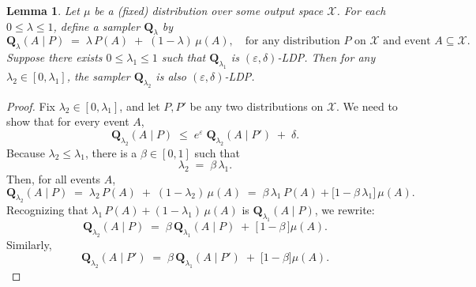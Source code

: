 \documentclass[accepted]{article}
\theoremstyle{plain} %
\newtheorem{lemma}[theorem]{Lemma}
\theoremstyle{definition}
\theoremstyle{remark}
\newcommand{\bQ}{\mathbf{Q}}
\begin{document}
\begin{lemma}\label{lem:decrease-lambda}
Let $\mu$ be a (fixed) distribution over some output space $\mathcal{X}$. For each $0 \leq \lambda \leq 1$, define a sampler $\bQ_\lambda$ by
\[
  \bQ_\lambda(A \mid P) \;=\; \lambda\,P(A) \;+\; (1-\lambda)\,\mu(A),
  \quad
  \text{for any distribution }P \text{ on } \mathcal{X} \text{ and event } A \subseteq \mathcal{X}.
\]
Suppose there exists $0 \leq \lambda_1 \leq 1$ such that $\bQ_{\lambda_1}$ is $(\varepsilon,\delta)$-LDP. Then for any $\lambda_2 \in [0,\lambda_1]$, the sampler $\bQ_{\lambda_2}$ is also $(\varepsilon,\delta)$-LDP.
\end{lemma}

\begin{proof}
Fix $\lambda_2 \in [0,\lambda_1]$, and let $P,P'$ be any two distributions on $\mathcal{X}$. We need to show that for every event $A$,
\[
  \bQ_{\lambda_2}(A \mid P)
  \;\le\;
  e^\varepsilon\;\bQ_{\lambda_2}(A \mid P')
  \;+\;
  \delta.
\]
Because $\lambda_2 \le \lambda_1$, there is a $\beta \in [0,1]$ such that
\[
  \lambda_2 \;=\;\beta \,\lambda_1.
\]
Then, for all events $A$,
\[
  \bQ_{\lambda_2}(A \mid P)
  \;=\;
  \lambda_2\,P(A) \;+\; (1-\lambda_2)\,\mu(A)
  \;=\;
  \beta\,\lambda_1\,P(A) + \bigl[1 - \beta\,\lambda_1\bigr]\,\mu(A).
\]
Recognizing that $\lambda_1\,P(A) + (1-\lambda_1)\,\mu(A)$ is $\bQ_{\lambda_1}(A \mid P)$, we rewrite:
\[
  \bQ_{\lambda_2}(A \mid P)
  \;=\;
  \beta\,\bQ_{\lambda_1}(A \mid P)
  \;+\;
  \bigl[\,1-\beta\,\bigr]\mu(A).
\]
Similarly,
\[
  \bQ_{\lambda_2}(A \mid P')
  \;=\;
  \beta\,\bQ_{\lambda_1}(A \mid P') \;+\; \bigl[1-\beta\bigr]\mu(A).
\]


\end{proof}
\end{document}
